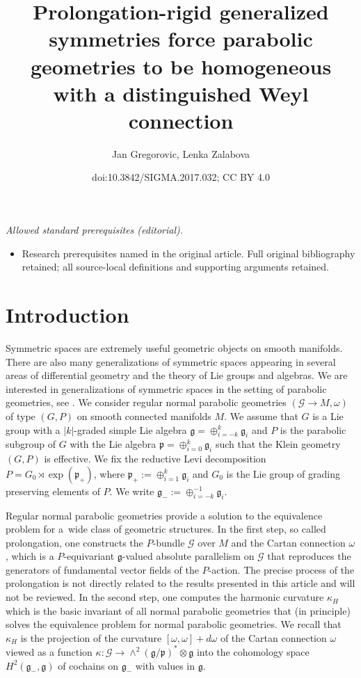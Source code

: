 \documentclass[10pt,a4paper]{amsart}
\title{Prolongation-rigid generalized symmetries force parabolic geometries to be homogeneous with a distinguished Weyl connection}
\author{Jan Gregorovic, Lenka Zalabova}
\date{doi:10.3842/SIGMA.2017.032; CC BY 4.0}
\newcommand{\om}{\omega}
\newcommand{\ba}{\mathcal{G}}
\newcommand{\fg}{\mathfrak g}
\newcommand{\fp}{\mathfrak p}
\numberwithin{equation}{section}
\begin{document}
\maketitle
\noindent\textit{Allowed standard prerequisites (editorial).}\begin{itemize}
\item Research prerequisites named in the original article. Full original bibliography retained; all source-local definitions and supporting arguments retained.
\end{itemize}\medskip
\section{Introduction}

Symmetric spaces are extremely useful geometric objects on smooth manifolds. There are also many generalizations of symmetric spaces appearing in several areas of dif\/ferential geometry and the theory of Lie groups and algebras. We are interested in generalizations of symmetric spaces in the setting of parabolic geometries, see \cite[Section~3.1]{parabook}. We consider regular normal parabolic geometries $(\ba\to M,\om)$ of type $(G,P)$ on smooth connected manifolds $M$. We assume that $G$ is a Lie group with a $|k|$-graded simple Lie algebra $\fg=\oplus_{i=-k}^{k}\fg_i$ and $P$ is the parabolic subgroup of $G$ with the Lie algebra $\fp=\oplus_{i=0}^{k}\fg_i$ such that the Klein geometry $(G,P)$ is ef\/fective. We f\/ix the reductive Levi decomposition $P=G_0\rtimes \exp (\fp_+)$, where $\fp_+:=\oplus_{i=1}^{k}\fg_i$ and $G_0$ is the Lie group of grading preserving elements of $P$. We write $\fg_-:=\oplus_{i=-k}^{-1}\fg_i$.

Regular normal parabolic geometries provide a solution to the equivalence problem for a~wide class of geometric structures. In the f\/irst step, so called prolongation, one constructs the $P$-bundle $\ba$ over $M$ and the Cartan connection $\om$, which is a $P$-equivariant $\fg$-valued absolute parallelism on $\ba$ that reproduces the generators of fundamental vector f\/ields of the $P$-action. The precise process of the prolongation is not directly related to the results presented in this article and will not be reviewed. In the second step, one computes the harmonic curvature $\kappa_H$ which is the basic invariant of all normal parabolic geometries that (in principle) solves the equivalence problem for normal parabolic geometries. We recall that $\kappa_H$ is the projection of the curvature $[\om,\om]+d\om$ of the Cartan connection $\om$ viewed as a function $\kappa\colon \ba\to \wedge^2 (\fg/\fp)^*\otimes \fg$ into the cohomology space $H^2(\fg_-,\fg)$ of cochains on $\fg_-$ with values in $\fg$.
\end{document}
